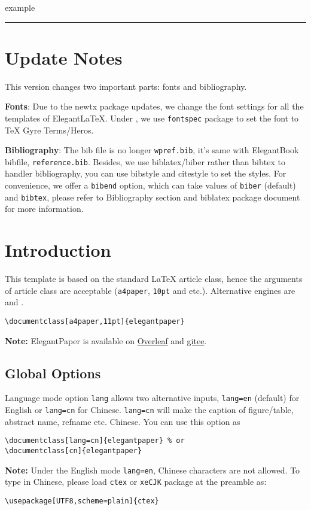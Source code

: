 \documentclass[lang=en,a4paper,bibend=bibtex]{elegantcs}
\begin{document}
 example

\noindent\rule{\textwidth}{1pt}

\section*{Update Notes}

This version changes two important parts: fonts and bibliography.

\textbf{Fonts}: Due to the newtx package updates, we change the font settings for all the templates of ElegantLaTeX. Under , we use \lstinline{fontspec} package  to set the font to TeX Gyre Terms/Heros.

\textbf{Bibliography}: The bib file is no longer \lstinline{wpref.bib}, it's same with ElegantBook bibfile, \lstinline{reference.bib}. Besides, we use biblatex/biber rather than bibtex to handler bibliography, you can use bibstyle and citestyle to set the styles. For convenience, we offer a \lstinline{bibend} option, which can take values of \lstinline{biber} (default) and \lstinline{bibtex}, please refer to Bibliography section and biblatex package document for more information.

\section{Introduction}

This template is based on the standard \LaTeX{} article class, hence the arguments of article class are acceptable (\lstinline{a4paper}, \lstinline{10pt} and etc.). Alternative engines are  and .

\begin{lstlisting}[style=Latex]
\documentclass[a4paper,11pt]{elegantpaper}
\end{lstlisting}
\textbf{Note:} ElegantPaper is available on  \href{https://www.overleaf.com/latex/templates/elegantpaper-template/yzghrqjhmmmr}{Overleaf} and \href{https://gitee.com/ElegantLaTeX/ElegantPaper}{gitee}.

\subsection{Global Options}
Language mode option \lstinline{lang} allows two alternative inputs, \lstinline{lang=en} (default)  for English or \lstinline{lang=cn} for Chinese. \lstinline{lang=cn} will make the caption of figure/table, abstract name, refname etc. Chinese. You can use this option as
\begin{lstlisting}[style=Latex]
\documentclass[lang=cn]{elegantpaper} % or
\documentclass[cn]{elegantpaper}
\end{lstlisting}
\textbf{Note:} Under the English mode \lstinline{lang=en}, Chinese characters are not allowed. To type in Chinese, please load  \lstinline{ctex} or \lstinline{xeCJK} package at the preamble as:
\begin{lstlisting}[style=Latex]
\usepackage[UTF8,scheme=plain]{ctex}
\end{lstlisting}
\end{document}
